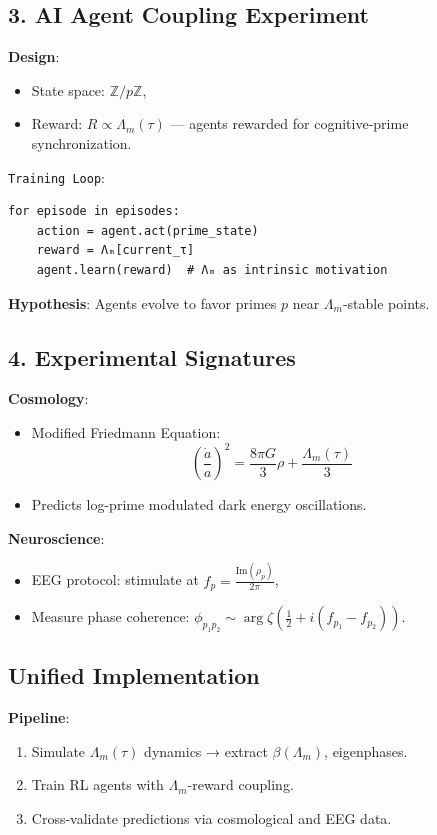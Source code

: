 \documentclass[12pt]{article}
\theoremstyle{plain}
\begin{document}
\subsection*{3. AI Agent Coupling Experiment}
\textbf{Design}:
\begin{itemize}
    \item State space: \(\mathbb{Z}/p\mathbb{Z}\),
    \item Reward: \(R \propto \Lambda_m(\tau)\) — agents rewarded for cognitive-prime synchronization.
\end{itemize}

\texttt{Training Loop}:
\begin{verbatim}
for episode in episodes:  
    action = agent.act(prime_state)  
    reward = Λₘ[current_τ]  
    agent.learn(reward)  # Λₘ as intrinsic motivation
\end{verbatim}

\textbf{Hypothesis}:
Agents evolve to favor primes \(p\) near \(\Lambda_m\)-stable points.

\subsection*{4. Experimental Signatures}
\textbf{Cosmology}:
\begin{itemize}
    \item Modified Friedmann Equation:
    \[
    \left(\frac{\dot{a}}{a}\right)^2 = \frac{8\pi G}{3}\rho + \frac{\Lambda_m(\tau)}{3}
    \]
    \item Predicts log-prime modulated dark energy oscillations.
\end{itemize}

\textbf{Neuroscience}:
\begin{itemize}
    \item EEG protocol: stimulate at \(f_p = \frac{\text{Im}(\rho_p)}{2\pi}\),
    \item Measure phase coherence: \(\phi_{p_1 p_2} \sim \arg \zeta\left(\frac{1}{2} + i(f_{p_1} - f_{p_2})\right)\).
\end{itemize}

\subsection*{Unified Implementation}
\textbf{Pipeline}:
\begin{enumerate}
    \item Simulate \(\Lambda_m(\tau)\) dynamics → extract \(\beta(\Lambda_m)\), eigenphases.
    \item Train RL agents with \(\Lambda_m\)-reward coupling.
    \item Cross-validate predictions via cosmological and EEG data.
\end{enumerate}
\end{document}
